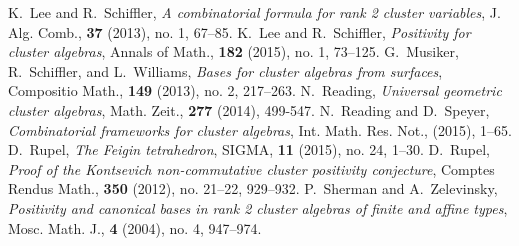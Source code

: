 \documentclass[11pt]{amsart}
\theoremstyle{remark}
\numberwithin{equation}{section}
\begin{document}
\begin{thebibliography}{99}
   K.~Lee and R.~Schiffler, \emph{A combinatorial formula for rank 2 cluster variables}, J. Alg. Comb., {\bf 37} (2013), no. 1, 67--85.
   K.~Lee and R.~Schiffler, \emph{Positivity for cluster algebras}, Annals of Math., {\bf 182} (2015), no. 1, 73--125.
   G.~Musiker, R.~Schiffler, and L.~Williams, \emph{Bases for cluster algebras from surfaces}, Compositio Math., {\bf 149} (2013), no. 2, 217--263.
   N.~Reading, \emph{Universal geometric cluster algebras}, Math. Zeit., {\bf 277 } (2014), 499-547.
   N.~Reading and D.~Speyer, \emph{Combinatorial frameworks for cluster algebras}, Int. Math. Res. Not., (2015), 1--65.
   D.~Rupel, \emph{The Feigin tetrahedron}, SIGMA, {\bf 11} (2015), no. 24, 1--30.
   D.~Rupel, \emph{Proof of the Kontsevich non-commutative cluster positivity conjecture}, Comptes Rendus Math., {\bf 350} (2012), no. 21--22, 929--932.
   P.~Sherman and A.~Zelevinsky, \emph{Positivity and canonical bases in rank 2 cluster algebras of finite and affine types}, Mosc. Math. J., \textbf{4} (2004), no. 4, 947--974.

\end{thebibliography}
\end{document}
